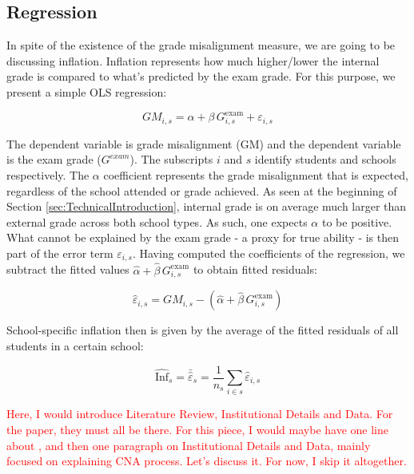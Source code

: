 \documentclass{article}
\begin{document}

\subsection{Regression}
\label{sec:regression}

In spite of the existence of the grade misalignment measure, we are going to be discussing inflation. Inflation represents how much higher/lower the internal grade is compared to what’s predicted by the exam grade. For this purpose, we present a simple OLS regression:

\begin{equation}
GM_{i,s} = \alpha + \beta \, G^{\text{exam}}_{i,s} + \varepsilon_{i,s} \nonumber
\end{equation}

The dependent variable is grade misalignment (GM) and the dependent variable is the exam grade ($G^{exam}$). The subscripts $i$ and $s$ identify students and schools respectively. The $\alpha$ coefficient represents the grade misalignment that is expected, regardless of the school attended or grade achieved. As seen at the beginning of Section \ref{sec:TechnicalIntroduction}, internal grade is on average much larger than external grade across both school types. As such, one expects $\alpha$ to be positive. What cannot be explained by the exam grade - a proxy for true ability - is then part of the error term $\varepsilon_{i,s}$. Having computed the coefficients of the regression, we subtract the fitted values $\hat{\alpha} + \hat{\beta}  \, G^{\text{exam}}_{i,s}$ to obtain fitted residuals:

\begin{equation}
\hat{\varepsilon}_{i,s} = GM_{i,s} - \left( \hat{\alpha} + \hat{\beta}  \, G^{\text{exam}}_{i,s} \right) \nonumber
\end{equation}

School-specific inflation then is given by the average of the fitted residuals of all students in a certain school:

\begin{equation}
\widehat{\text{Inf}}_{s}
= \bar{\hat{\varepsilon}}_{s}
= \frac{1}{n_s}\sum_{i \in s}\hat{\varepsilon}_{i,s} \nonumber
\end{equation}




\textcolor{red}{Here, I would introduce Literature Review, Institutional Details and Data. For the paper, they must all be there. For this piece, I would maybe have one line about \citep{nata2014unfairness}, and then one paragraph on Institutional Details and Data, mainly focused on explaining CNA process. Let's discuss it. For now, I skip it altogether.}
\end{document}
